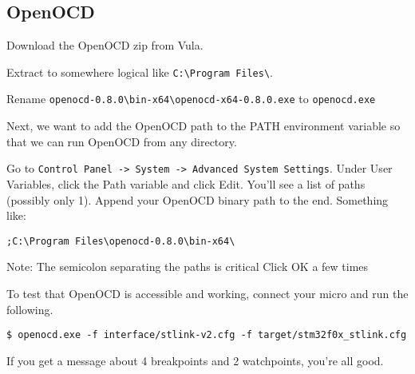 \subsection{OpenOCD}
Download the OpenOCD zip from Vula. 

Extract to somewhere logical like \verb+C:\Program Files\+. 

Rename \verb+openocd-0.8.0\bin-x64\openocd-x64-0.8.0.exe+ to \verb+openocd.exe+

Next, we want to add the OpenOCD path to the PATH environment variable so that we can run OpenOCD from any directory.

Go to \verb+Control Panel -> System -> Advanced System Settings+. Under User Variables, click the Path variable and click Edit. You’ll see a list of paths (possibly only 1). Append your OpenOCD binary path to the end.
Something like:
\begin{verbatim}
;C:\Program Files\openocd-0.8.0\bin-x64\
\end{verbatim}
Note: The semicolon separating the paths is critical Click OK a few times 

To test that OpenOCD is accessible and working, connect your micro and run the following.
\begin{lstlisting}[style=BashStyle]
$ openocd.exe -f interface/stlink-v2.cfg -f target/stm32f0x_stlink.cfg
\end{lstlisting}
If you get a message about 4 breakpoints and 2 watchpoints, you're all good.

